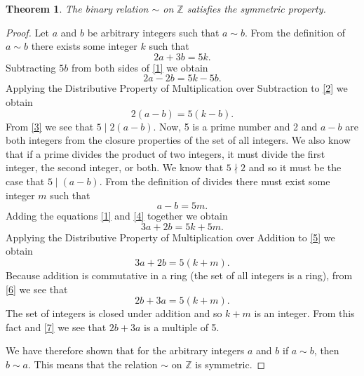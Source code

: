 \documentclass[12pt]{article}
\newtheorem{thm}{Theorem}
\begin{document}
\begin{thm}
The binary relation $\sim$ on $\mathbb{Z}$ satisfies the symmetric property.
\end{thm}
\begin{proof}
Let $a$ and $b$ be arbitrary integers such that $a\sim b$. From the definition of $a\sim b$ there exists some integer $k$ such that
\begin{equation}\label{1}
2a + 3b = 5k.
\end{equation}
Subtracting $5b$ from both sides of \eqref{1} we obtain
\begin{equation}\label{2}
2a - 2b = 5k - 5b.
\end{equation}
Applying the Distributive Property of Multiplication over Subtraction to \eqref{2} we obtain
\begin{equation}\label{3}
2(a-b) = 5(k-b).
\end{equation}
From \eqref{3} we see that $5\mid 2(a-b)$. Now, 5 is a prime number and 2 and $a-b$ are both integers from the closure properties of the set of all integers. We also know that if a prime divides the product of two integers, it must divide the first integer, the second integer, or both. We know that $5 \nmid 2$ and so it must be the case that $5\mid (a-b)$. From the definition of divides there must exist some integer $m$ such that
\begin{equation}\label{4}
a-b=5m.
\end{equation}
Adding the equations \eqref{1} and \eqref{4} together we obtain
\begin{equation}\label{5}
3a + 2b = 5k + 5m.
\end{equation}
Applying the Distributive Property of Multiplication over Addition to \eqref{5} we obtain
\begin{equation}\label{6}
3a + 2b = 5(k+m).
\end{equation}
Because addition is commutative in a ring (the set of all integers is a ring), from \eqref{6} we see that
\begin{equation}\label{7}
2b + 3a = 5(k+m).
\end{equation}
The set of integers is closed under addition and so $k+m$ is an integer. From this fact and \eqref{7} we see that $2b+3a$ is a multiple of 5. 

We have therefore shown that for the arbitrary integers $a$ and $b$ if $a\sim b$, then $b \sim a$. This means that the relation $\sim$ on $\mathbb{Z}$ is symmetric.
\end{proof}
\end{document}
